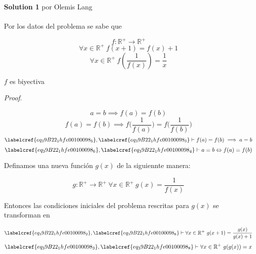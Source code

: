 \noindent\textbf{Solution 1} por Olemis Lang \\\\

Por los datos del problema se sabe que

\begin{equation} \label{eq_39B22_1hfe00100098_1}
	f: \mathbb{R}^{+} \to \mathbb{R}^{+}
\end{equation}
\begin{equation} \label{eq_39B22_1hfe00100098_2}
	\forall x \in  \mathbb{R}^{+}\ f(x+1) = f(x) + 1
\end{equation}
\begin{equation} \label{eq_39B22_1hfe00100098_3}
	\forall x \in  \mathbb{R}^{+}\ f\left(\frac{1}{f(x)}\right) = \frac{1}{x}
\end{equation}

\begin{claim}
	$f$ es biyectiva 
\end{claim}
\textit{Proof}. 

\begin{equation} \label{eq_39B22_1hfe00100098_4}
	a = b \implies f(a) = f(b)
\end{equation}
\begin{equation} \label{eq_39B22_1hfe00100098_5}
	f(a) = f(b) \implies f \bigg(\frac{1}{f(a)}\bigg) = f\bigg(\frac{1}{f(b)}\bigg) 
\end{equation}
\begin{equation} \label{eq_39B22_1hfe00100098_6}
	\labelcref{eq_39B22_1hfe00100098_5}, \labelcref{eq_39B22_1hfe00100098_3} \vdash f(a) = f(b) \implies a = b
\end{equation}
\begin{equation} \label{eq_39B22_1hfe00100098_7}
\labelcref{eq_39B22_1hfe00100098_6}, \labelcref{eq_39B22_1hfe00100098_4} \vdash a = b \Leftrightarrow f(a) = f(b)
\end{equation}

Definamos una nueva función $g(x)$ de la siguiennte manera:

\begin{equation} \label{eq_39B22_1hfe00100098_8}
	g: \mathbb{R}^{+} \to \mathbb{R}^{+}\ \forall x \in \mathbb{R}^{+}\ g(x) = \frac{1}{f(x)}
\end{equation}

Entonces las condiciones iniciales del problema rescritas para $g(x)$ se transforman en

\begin{equation} \label{eq_39B22_1hfe00100098_9}
	\labelcref{eq_39B22_1hfe00100098_2} , \labelcref{eq_39B22_1hfe00100098_8} \vdash \forall x \in  \mathbb{R}^{+}\ g(x+1) = \frac{g(x)}{g(x) + 1}
\end{equation}
\begin{equation} \label{eq_39B22_1hfe00100098_10}
	\labelcref{eq_39B22_1hfe00100098_3} , \labelcref{eq_39B22_1hfe00100098_8} \vdash \forall x \in  \mathbb{R}^{+}\ g(g(x)) = x
\end{equation}

